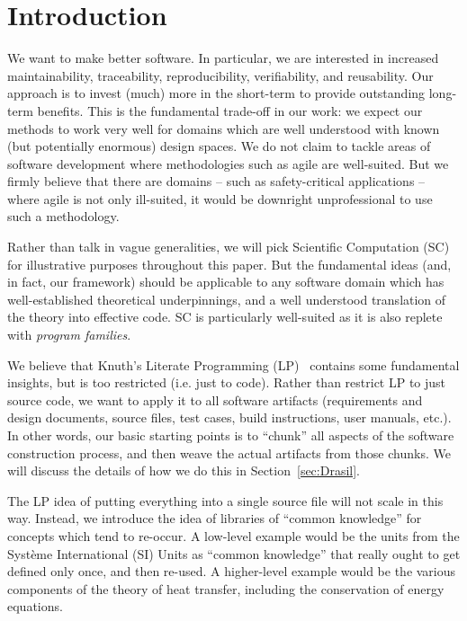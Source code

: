\documentclass[preprint, 10pt]{sigplanconf}
\begin{document}
\section{Introduction}
\label{sec:Intro}

We want to make better software.  In particular, we are interested in
increased maintainability, traceability, reproducibility, verifiability, and
reusability.  Our approach is to invest (much) more in the short-term to provide
outstanding long-term benefits. This is the fundamental trade-off in
our work: we expect our methods to work very well for domains which are 
well understood with known (but potentially enormous) design spaces.  We do
not claim to tackle areas of software development where methodologies such
as agile are well-suited.  But we firmly believe that there are domains --
such as safety-critical applications -- where agile is not only ill-suited,
it would be downright unprofessional to use such a methodology.

Rather than talk in vague generalities, we will pick Scientific Computation
(SC) for illustrative purposes throughout this paper.  But the fundamental
ideas (and, in fact, our framework) should be applicable to any software
domain which has well-established theoretical underpinnings, and a well
understood translation of the theory into effective code.  SC is particularly
well-suited as it is also replete with \emph{program families}.

We believe that Knuth's Literate Programming (LP)~\cite{Knuth1984} contains
some fundamental insights, but is too restricted (i.e. just to code).  Rather
than restrict LP to just source code, we want to apply it to all software
artifacts (requirements and design documents, source files, test cases, build
instructions, user manuals, etc.).  In other words, our basic starting points is
to ``chunk'' all aspects of the software construction process, and then weave the
actual artifacts from those chunks.  We will discuss the details of how we do this
in Section~\ref{sec:Drasil}.

The LP idea of putting everything into a single source file will not scale
in this way.  Instead, we introduce the idea of libraries of ``common knowledge''
for concepts which tend to re-occur.  A low-level example would be the units
from the Syst\`{e}me International (SI) Units as ``common knowledge'' that really
ought to get defined only once, and then re-used.  A higher-level example would be
the various components of the theory of heat transfer, including the conservation
of energy equations.
\end{document}
